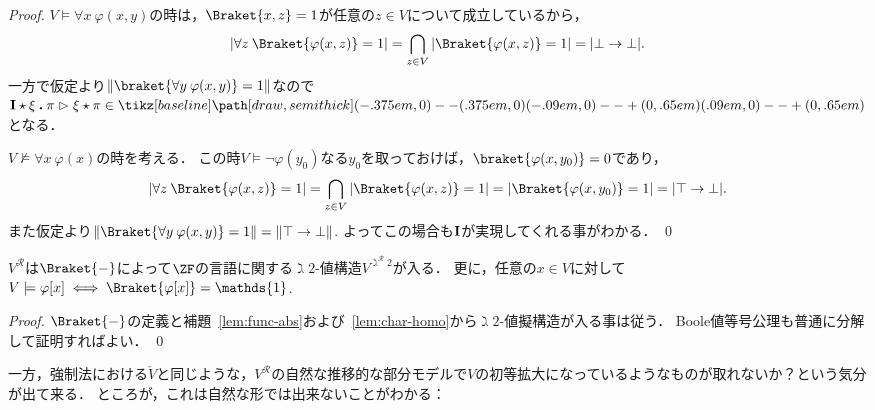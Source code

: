 \documentclass[realisability.tex]{subfiles}
\begin{document}
\begin{proof}
 $V \models \forall x \: \varphi(x, y)$の時は，$\Braket{x, z} = 1$が任意の$z \in V$について成立しているから，
 \[
 \left|\forall z \: \Braket{\varphi(x,z)} = 1\right| = \bigcap_{z \in V} \left|\Braket{\varphi(x, z)} = 1\right| = | \bot \to \bot |.
 \]
 一方で仮定より$\|\braket{\forall y \: \varphi(x, y)} = 1\|$なので$\comb{I} \cons \xi \push \pi \reds \xi \cons \pi \in \pole$となる．

 $V \not\models \forall x \: \varphi(x)$の時を考える．
 この時$V \models \neg \varphi(y_0)$なる$y_0$を取っておけば，$\braket{\varphi(x, y_0)} = 0$であり，
 \[
 \left|\forall z \: \Braket{\varphi(x,z)} = 1\right| = \bigcap_{z \in V} \left|\Braket{\varphi(x, z)} = 1\right| = |\Braket{\varphi(x, y_0)} = 1| = | \top \to \bot |.
 \]
 また仮定より$\|\Braket{\forall y\: \varphi(x, y)} = 1\| = \|\top \to \bot\|$.
 よってこの場合も$\mathsf{\mathbf{I}}$が実現してくれる事がわかる． \qed
\end{proof}

\begin{corollary}
 $V^{\mathcal{R}}$は$\Braket{-}$によって$\ZF$の言語に関する$\gimel 2$-値構造$V^{\gimel^{\mathcal{R}} 2}$が入る．
 更に，任意の$x \in V$に対して$V \models \varphi[x] \iff \Braket{\varphi[x]} = \mathds{1}$.
\end{corollary}
\begin{proof}
 $\Braket{-}$の定義と補題~\ref{lem:func-abs}および~\ref{lem:char-homo}から$\gimel 2$-値擬構造が入る事は従う．
 Boole値等号公理も普通に分解して証明すればよい． \qed
\end{proof}

一方，強制法における$\check{V}$と同じような，$V^{\mathcal{R}}$の自然な推移的な部分モデルで$V$の初等拡大になっているようなものが取れないか？という気分が出て来る．
ところが，これは自然な形では出来ないことがわかる：
\end{document}
